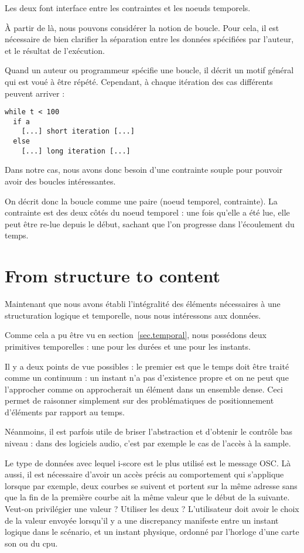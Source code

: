 \documentclass{sigchi}
\begin{document}
Les deux font interface entre les contraintes et les noeuds temporels.

À partir de là, nous pouvons considérer la notion de boucle. Pour cela, il est nécessaire de bien clarifier la séparation entre les données spécifiées par l'auteur, et le résultat de l'exécution.

Quand un auteur ou programmeur spécifie une boucle, il décrit un motif général qui est voué à être répété. Cependant, à chaque itération des cas différents peuvent arriver : 

\begin{lstlisting}
while t < 100
  if a
    [...] short iteration [...]
  else
    [...] long iteration [...]           
\end{lstlisting}

Dans notre cas, nous avons donc besoin d'une contrainte souple pour pouvoir avoir des boucles intéressantes. 

On décrit donc la boucle comme une paire (noeud temporel, contrainte). La contrainte est des deux côtés du noeud temporel : une fois qu'elle a été lue, elle peut être re-lue depuis le début, sachant que l'on progresse dans l'écoulement du temps.


\section{From structure to content}
Maintenant que nous avons établi l'intégralité des éléments nécessaires à une structuration logique et temporelle, nous nous intéressons aux données.

Comme cela a pu être vu en section~\ref{sec.temporal}, nous possédons deux primitives temporelles : une pour les durées et une pour les instants.

Il y a deux points de vue possibles : le premier est que le temps doit être traité comme un continuum : un instant n'a pas d'existence propre et on ne peut que l'approcher comme on approcherait un élément dans un ensemble dense. Ceci permet de raisonner simplement sur des problématiques de positionnement d'éléments par rapport au temps.

Néanmoins, il est parfois utile de briser l'abstraction et d'obtenir le contrôle bas niveau : dans des logiciels audio, c'est par exemple le cas de l'accès à la sample.

Le type de données avec lequel i-score est le plus utilisé est le message OSC. Là aussi, il est nécessaire d'avoir un accès précis au comportement qui s'applique lorsque par exemple, deux courbes se suivent et portent sur la même adresse sans que la fin de la première courbe ait la même valeur que le début de la suivante. Veut-on privilégier une valeur ? Utiliser les deux ? L'utilisateur doit avoir le choix de la valeur envoyée lorsqu'il y a une discrepancy manifeste entre un instant logique dans le scénario, et un instant physique, ordonné par l'horloge d'une carte son ou du cpu.
\end{document}
